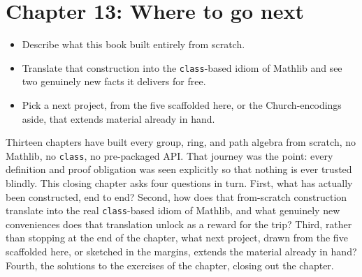 \chapter{Chapter 13: Where to go next}\label{sec:13-next-steps:00-index:1}

\begin{learningobjectives}
\begin{itemize}
\tightlist
\item
  Describe what this book built entirely from scratch.
\item
  Translate that construction into the \texttt{class}-based idiom of Mathlib and see two genuinely new facts it delivers for free.
\item
  Pick a next project, from the five scaffolded here, or the Church-encodings aside, that extends material already in hand.
\end{itemize}
\end{learningobjectives}


Thirteen chapters have built every group, ring, and path algebra from scratch, no Mathlib, no \texttt{class}, no pre-packaged API. That journey was the point: every definition and proof obligation was seen explicitly so that nothing is ever trusted blindly. This closing chapter asks four questions in turn. First, what has actually been constructed, end to end? Second, how does that from-scratch construction translate into the real \texttt{class}-based idiom of Mathlib, and what genuinely new conveniences does that translation unlock as a reward for the trip? Third, rather than stopping at the end of the chapter, what next project, drawn from the five scaffolded here, or sketched in the margins, extends the material already in hand? Fourth, the solutions to the exercises of the chapter, closing out the chapter.






